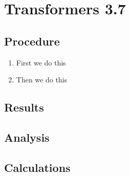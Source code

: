 \documentclass[12pt,letterpaper]{report}
\begin{document}
\section*{Transformers 3.7}
\subsection*{Procedure}

\begin{enumerate}
\item First we do this
\item Then we do this
\end{enumerate}

\subsection*{Results}

\subsection*{Analysis}

\subsection*{Calculations}
\end{document}
